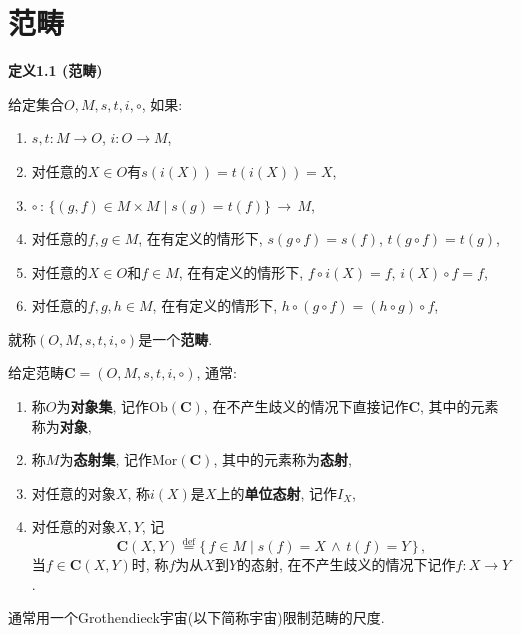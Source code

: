\documentclass[UTF8]{ctexart}
\begin{document}
\setlength{\abovedisplayskip}{1pt}
\setlength{\belowdisplayskip}{1pt}

\section{范畴}

\hypertarget{sec:定义1.1}{}
\noindent\textbf{定义1.1 (范畴)}

给定集合$O,M,s,t,i,\circ$, 如果:
\begin{enumerate}
    \item $s,t:M\to O$, $i:O\to M$,
    \item 对任意的$X\in O$有$s(i(X))=t(i(X))=X$,
    \item $\circ\,:\,\{(g,f)\in M\times M\mid s(g)=t(f)\}\,\to\,M$,
    \item 对任意的$f,g\in M$, 在有定义的情形下,
    $s(g\circ f)=s(f)$, $t(g\circ f)=t(g)$,
    \item 对任意的$X\in O$和$f\in M$, 在有定义的情形下,
    $f\circ i(X)=f$, $i(X)\circ f=f$,
    \item 对任意的$f,g,h\in M$, 在有定义的情形下,
    $h\circ(g\circ f)=(h\circ g)\circ f$,
\end{enumerate}
就称$(O,M,s,t,i,\circ)$是一个\textbf{范畴}.


\vspace{10pt}

给定范畴$\mathbf{C}=(O,M,s,t,i,\circ)$, 通常:
\begin{enumerate}
    \item 称$O$为\textbf{对象集}, 记作$\mathrm{Ob}(\mathbf{C})$,
    在不产生歧义的情况下直接记作$\mathbf{C}$, 其中的元素称为\textbf{对象},
    \item 称$M$为\textbf{态射集}, 记作$\mathrm{Mor}(\mathbf{C})$,
    其中的元素称为\textbf{态射},
    \item 对任意的对象$X$, 称$i(X)$是$X$上的\textbf{单位态射}, 记作$I_X$,
    \item 对任意的对象$X,Y$, 记
    \[
        \mathbf{C}(X,Y)\overset{\mathrm{def}}{=}
        \{\,f\in M\mid s(f)=X\,\land\,t(f)=Y\,\}\,,
    \]
    当$f\in\mathbf{C}(X,Y)$时, 称$f$为从$X$到$Y$的态射,
    在不产生歧义的情况下记作$f:X\to Y$.
\end{enumerate}

\vspace{10pt}

通常用一个Grothendieck宇宙(以下简称宇宙)限制范畴的尺度.

\vspace{10pt}
\end{document}
